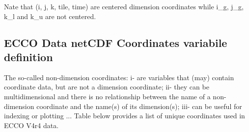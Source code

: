 

\par Nate that (i, j, k, tile, time) are centered dimension coordinates while i\_g, j\_g, k\_l and k\_u are not centered.

\subsection{ECCO Data netCDF Coordinates variabile definition}

The so-called non-dimension coordinates: i- are variables that (may) contain coordinate data, but are not a dimension coordinate; ii- they can be multidimensional and there is no relationship between the name of a non-dimension coordinate and the name(s) of its dimension(s); iii- can be useful for indexing or plotting ... Table below provides a list of unique coordinates used in ECCO V4r4 data.






